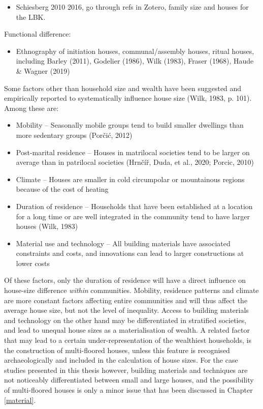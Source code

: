 \documentclass[
  12pt,
]{book}
\providecommand{\tightlist}{%
  \setlength{\itemsep}{0pt}\setlength{\parskip}{0pt}}
\begin{document}
\begin{itemize}
\tightlist
\item
  Schiesberg 2010 2016, go through refs in Zotero, family size and houses for the LBK.
\end{itemize}

Functional difference:

\begin{itemize}
\tightlist
\item
  Ethnography of initiation houses, communal/assembly houses, ritual houses, including Barley (2011), Godelier (1986), Wilk (1983), Fraser (1968), Haude \& Wagner (2019)
\end{itemize}

Some factors other than household size and wealth have been suggested and empirically reported to systematically influence house size (Wilk, 1983, p. 101). Among these are:

\begin{itemize}
\item
  Mobility -- Seasonally mobile groups tend to build smaller dwellings than more sedentary groups (Porčić, 2012)
\item
  Post-marital residence -- Houses in matrilocal societies tend to be larger on average than in patrilocal societies (Hrnčíř, Duda, et al., 2020; Porcic, 2010)
\item
  Climate -- Houses are smaller in cold circumpolar or mountainous regions because of the cost of heating
\item
  Duration of residence -- Households that have been established at a location for a long time or are well integrated in the community tend to have larger houses (Wilk, 1983)
\item
  Material use and technology -- All building materials have associated constraints and costs, and innovations can lead to larger constructions at lower costs
\end{itemize}

Of these factors, only the duration of residence will have a direct influence on house-size difference \emph{within} communities. Mobility, residence patterns and climate are more constant factors affecting entire communities and will thus affect the average house size, but not the level of inequality. Access to building materials and technology on the other hand may be differentiated in stratified societies, and lead to unequal house sizes as a materialisation of wealth. A related factor that may lead to a certain under-representation of the wealthiest households, is the construction of multi-floored houses, unless this feature is recognised archaeologically and included in the calculation of house sizes. For the case studies presented in this thesis however, building materials and techniques are not noticeably differentiated between small and large houses, and the possibility of multi-floored houses is only a minor issue that has been discussed in Chapter \ref{material}.
\end{document}
